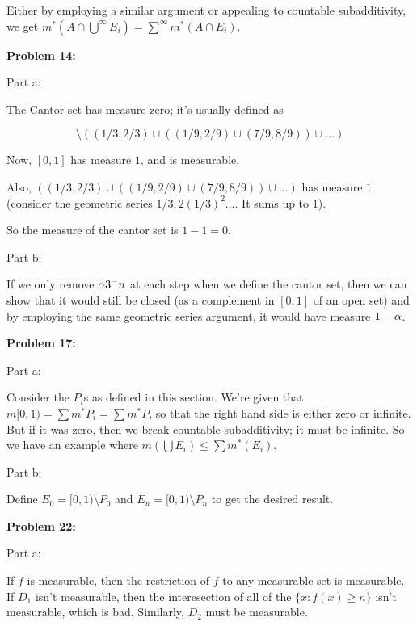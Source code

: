 \documentclass[a4paper,12pt]{article}
\begin{document}
Either by employing a similar argument or appealing to countable subadditivity, we get $m^*(A \cap \bigcup\limits^\infty E_i) = \sum\limits^\infty m^*(A \cap E_i)$.

\shunt

{\bf Problem 14:}

Part a:

The Cantor set has measure zero; it's usually defined as

\begin{displaymath}
[0,1] \setminus ((1/3,2/3) \cup ((1/9,2/9) \cup (7/9,8/9)) \cup \ldots)
\end{displaymath}

Now, $[0,1]$ has measure $1$, and is measurable.

Also, $((1/3,2/3) \cup ((1/9,2/9) \cup (7/9,8/9)) \cup \ldots)$ has measure $1$ (consider the geometric series $1/3, 2(1/3)^2 \ldots$. It sums up to $1$).

So the measure of the cantor set is $1-1=0$.

\shunt

Part b:

If we only remove $\alpha 3^-n$ at each step when we define the cantor set, then we can show that it would still be closed (as a complement in $[0,1]$ of an open set) and by employing the same geometric series argument, it would have measure $1-\alpha$.

\shunt

{\bf Problem 17:}

Part a:

Consider the $P_i$s as defined in this section. We're given that $m[0,1) = \sum m^*P_i = \sum m^*P$, so that the right hand side is either zero or infinite. But if it was zero, then we break countable subadditivity; it must be infinite. So we have an example where $m(\bigcup E_i) \leq \sum m^*(E_i)$.

\shunt

Part b:

Define $E_0 = [0,1) \setminus P_0$ and $E_n = [0,1) \setminus P_n$ to get the desired result.

\shunt

{\bf Problem 22:}

Part a:

If $f$ is measurable, then the restriction of $f$ to any measurable set is measurable. If $D_1$ isn't measurable, then the interesection of all of the $\{x: f(x) \geq n\}$ isn't measurable, which is bad. Similarly, $D_2$ must be measurable.
\end{document}
